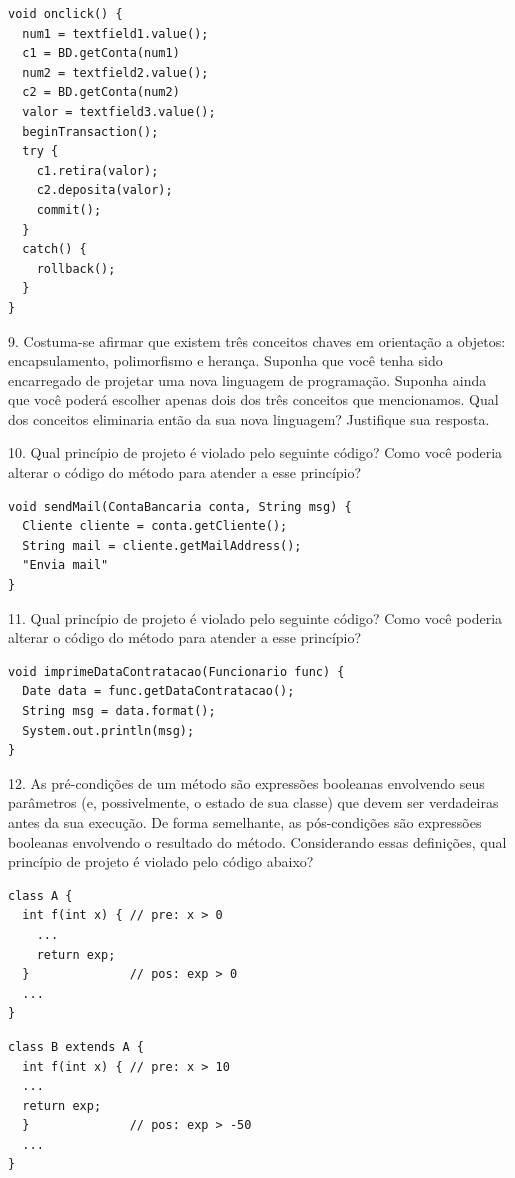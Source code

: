 \documentclass[
  11pt,
  twoside]{book}
\begin{document}
\begin{lstlisting}
void onclick() {
  num1 = textfield1.value();
  c1 = BD.getConta(num1)
  num2 = textfield2.value();
  c2 = BD.getConta(num2)
  valor = textfield3.value();
  beginTransaction();
  try {
    c1.retira(valor);
    c2.deposita(valor);
    commit();
  }          
  catch() {
    rollback();
  }
}  
\end{lstlisting}

9. Costuma-se afirmar que existem três conceitos chaves em orientação a
objetos: encapsulamento, polimorfismo e herança. Suponha que você tenha
sido encarregado de projetar uma nova linguagem de programação. Suponha
ainda que você poderá escolher apenas dois dos três conceitos que
mencionamos. Qual dos conceitos eliminaria então da sua nova linguagem?
Justifique sua resposta.

10. Qual princípio de projeto é violado pelo seguinte código? Como você
poderia alterar o código do método para atender a esse princípio?

\begin{lstlisting}
void sendMail(ContaBancaria conta, String msg) {
  Cliente cliente = conta.getCliente();
  String mail = cliente.getMailAddress();
  "Envia mail"
}  
\end{lstlisting}

11. Qual princípio de projeto é violado pelo seguinte código? Como você
poderia alterar o código do método para atender a esse princípio?

\begin{lstlisting}
void imprimeDataContratacao(Funcionario func) {
  Date data = func.getDataContratacao();
  String msg = data.format();
  System.out.println(msg);
}  
\end{lstlisting}

12. As pré-condições de um método são expressões booleanas envolvendo
seus parâmetros (e, possivelmente, o estado de sua classe) que devem ser
verdadeiras antes da sua execução. De forma semelhante, as pós-condições
são expressões booleanas envolvendo o resultado do método. Considerando
essas definições, qual princípio de projeto é violado pelo código
abaixo?

\begin{lstlisting}
class A {  
  int f(int x) { // pre: x > 0
    ...
    return exp;
  }              // pos: exp > 0
  ...
}
\end{lstlisting}

\begin{lstlisting}
class B extends A {  
  int f(int x) { // pre: x > 10
  ...
  return exp;
  }              // pos: exp > -50
  ...
}
\end{lstlisting}
\end{document}
